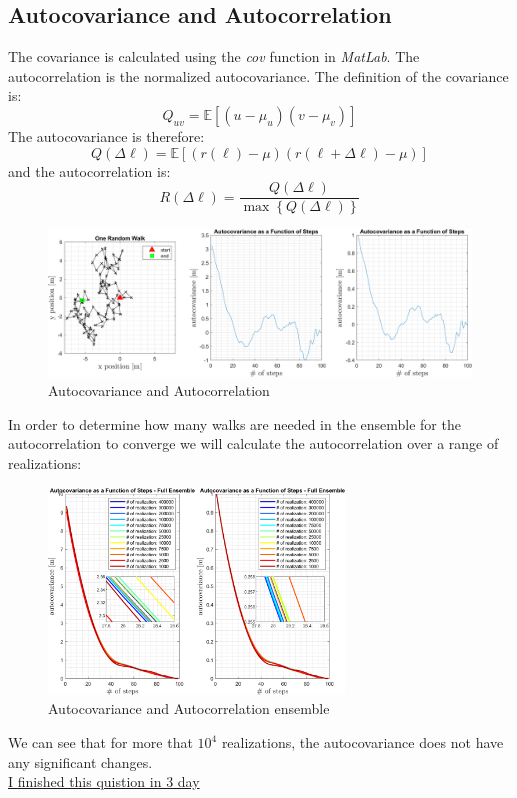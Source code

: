 \documentclass[11pt, a4paper]{article}
\begin{document}
\subsection{Autocovariance and Autocorrelation}
The covariance is calculated using the \emph{cov} function in \emph{MatLab}. The autocorrelation is the normalized autocovariance. The definition of the covariance is:
\begin{equation}
    Q_{uv}=\mathbb{E}\left[\left(u-\mu_u\right)\left(v-\mu_v\right)\right]
\end{equation}
The autocovariance is therefore:
\begin{equation}
    Q\left(\Delta\ell\right)=\mathbb{E}\left[\left(r\left(\ell\right)-\mu\right)\left(r\left(\ell+\Delta\ell\right)-\mu\right)\right]
\end{equation}
and the autocorrelation is:
\begin{equation}
    R\left(\Delta\ell\right)=\frac{Q\left(\Delta\ell\right)}{\max\left\{Q\left(\Delta\ell\right)\right\}}
\end{equation}
\begin{figure}[H]
    \centering
    \includegraphics[width=\textwidth]{images/graph4.png}
    \caption{Autocovariance and Autocorrelation}
    \label{fig: autocovariance and autocorrelation}
\end{figure}
\noindent In order to determine how many walks are needed in the ensemble for the autocorrelation to converge we will calculate the autocorrelation over a range of realizations:
\begin{figure}[H]
    \centering
    \includegraphics[width=0.7\textwidth]{images/graph5.png}
    \caption{Autocovariance and Autocorrelation ensemble}
    \label{fig: autocovariance and autocorrelation ensemble}
\end{figure}
\noindent We can see that for more that $10^4$ realizations, the autocovariance does not have any significant changes. \\
\underline{I finished this quistion in 3 day}
\end{document}
